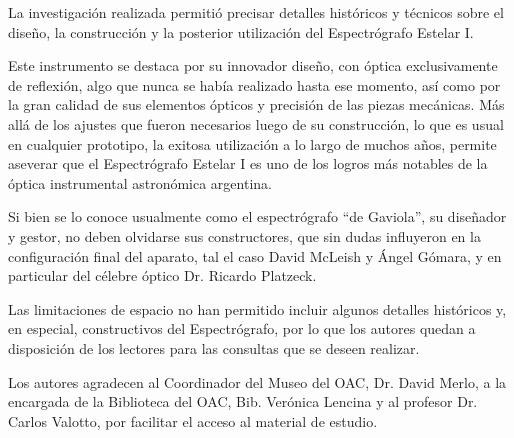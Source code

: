\documentclass[baaa]{baaa}
\begin{document}
La investigación realizada permitió precisar detalles históricos y técnicos sobre el diseño, la construcción y la posterior utilización del Espectrógrafo Estelar I. 

Este instrumento se destaca por su innovador diseño, con óptica exclusivamente de reflexión, algo que nunca se había realizado hasta ese momento, así como por la gran calidad de sus elementos ópticos y precisión de las piezas mecánicas. Más allá de los ajustes que fueron necesarios luego de su construcción, lo que es usual en cualquier prototipo, la exitosa utilización a lo largo de muchos años, permite aseverar que el Espectrógrafo Estelar I es uno de los logros más notables de la óptica instrumental astronómica argentina. 

Si bien se lo conoce usualmente como el espectrógrafo “de Gaviola”, su diseñador y gestor, no deben olvidarse sus constructores, que sin dudas influyeron en la configuración final del aparato, tal el caso David McLeish y Ángel Gómara, y en particular del célebre óptico Dr. Ricardo Platzeck.

Las limitaciones de espacio no han permitido incluir algunos detalles históricos y, en especial, constructivos del Espectrógrafo, por lo que los autores quedan a disposición de los lectores para las consultas que se deseen realizar.


\begin{acknowledgement}
Los autores agradecen al Coordinador del Museo del OAC, Dr. David Merlo, a la encargada de la Biblioteca del OAC, Bib. Verónica Lencina y al profesor Dr. Carlos Valotto, por facilitar el acceso al material de estudio.
\end{acknowledgement}



\small

 
\end{document}
